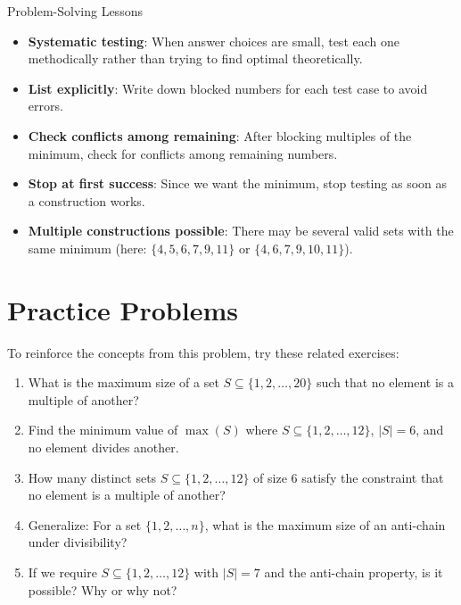 \documentclass[12pt]{article}
\begin{document}
\begin{highlightbox}{Problem-Solving Lessons}
\begin{itemize}
    \item \textbf{Systematic testing}: When answer choices are small, test each one methodically rather than trying to find optimal theoretically.
    
    \item \textbf{List explicitly}: Write down blocked numbers for each test case to avoid errors.
    
    \item \textbf{Check conflicts among remaining}: After blocking multiples of the minimum, check for conflicts among remaining numbers.
    
    \item \textbf{Stop at first success}: Since we want the minimum, stop testing as soon as a construction works.
    
    \item \textbf{Multiple constructions possible}: There may be several valid sets with the same minimum (here: $\{4,5,6,7,9,11\}$ or $\{4,6,7,9,10,11\}$).
\end{itemize}
\end{highlightbox}

\section*{Practice Problems}

To reinforce the concepts from this problem, try these related exercises:

\begin{enumerate}
    \item What is the maximum size of a set $S \subseteq \{1,2,\ldots,20\}$ such that no element is a multiple of another?
    
    \item Find the minimum value of $\max(S)$ where $S \subseteq \{1,2,\ldots,12\}$, $|S| = 6$, and no element divides another.
    
    \item How many distinct sets $S \subseteq \{1,2,\ldots,12\}$ of size 6 satisfy the constraint that no element is a multiple of another?
    
    \item Generalize: For a set $\{1,2,\ldots,n\}$, what is the maximum size of an anti-chain under divisibility?
    
    \item If we require $S \subseteq \{1,2,\ldots,12\}$ with $|S| = 7$ and the anti-chain property, is it possible? Why or why not?
\end{enumerate}
\end{document}
